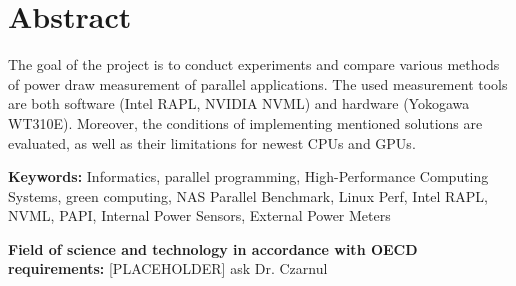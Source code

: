 \chapter*{Abstract}


The goal of the project is to conduct experiments and compare various methods
of power draw measurement of parallel applications. The used measurement
tools are both software (Intel RAPL, NVIDIA NVML) and hardware
(Yokogawa WT310E). Moreover, the conditions of implementing mentioned
solutions are evaluated, as well as their limitations for newest CPUs and GPUs.

\bigskip
\noindent
\textbf{Keywords:} Informatics, parallel programming,
High-Performance Computing Systems, green computing, NAS Parallel Benchmark,
Linux Perf, Intel RAPL, NVML, PAPI, Internal Power Sensors, External Power Meters

\bigskip
\noindent
\textbf{Field of science and technology in accordance with OECD
requirements:} [PLACEHOLDER] ask Dr. Czarnul


